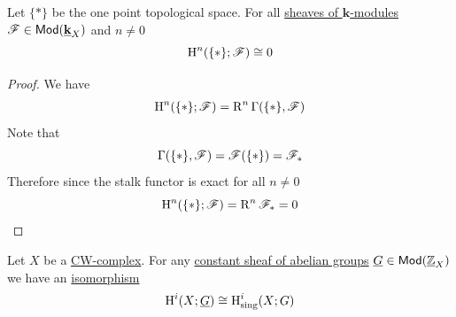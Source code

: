 \documentclass[../../main]{subfiles}
\begin{document}
\begin{theorem}[Dimension]
  Let \(\{\ast\}\) be the one point topological space.
  For all \hyperref[def:sheaf]{sheaves of \(\mathbf{k}\)-modules} \(\mathscr{F} \in \mathsf{Mod}(\underline{\mathbf{k}}_{X})\) and \(n \neq 0\)
  \begin{equation*}
    \operatorname{H}^{n}(\{\ast\}; \mathscr{F}) \cong 0
  \end{equation*}
\end{theorem}
\begin{proof}
  We have
  \begin{align*}
    \operatorname{H}^{n}( \{\ast\}; \mathscr{F} ) = \operatorname{R}^{n} \Gamma(\{\ast\}, \mathscr{F})
  \end{align*}
  Note that
  \begin{equation*}
    \Gamma(\{\ast\}, \mathscr{F}) = \mathscr{F}(\{\ast\}) = \mathscr{F}_{\ast}
  \end{equation*}
  Therefore since the stalk functor is exact for all \(n \neq 0\)
  \begin{equation*}
    \operatorname{H}^{n} (\{\ast\}; \mathscr{F}) = \operatorname{R}^{n} \mathscr{F}_{\ast} = 0 \qedhere
  \end{equation*}
\end{proof}



\begin{corollary}
  Let \(X\) be a \hyperref[def:CW-complex]{CW-complex}.
  For any \hyperref[def:constant-sheaf]{constant sheaf of abelian groups} \(\underline{G} \in \mathsf{Mod}(\underline{\mathbb{Z}}_{X})\) we have an \hyperref[def:categorical-isomorphism]{isomorphism}
    \begin{equation*}
        \operatorname{H}^{i}(X; \underline{G}) \cong \operatorname{H}_{\operatorname{sing}}^{i}(X; G)
    \end{equation*}
\end{corollary}
\end{document}

